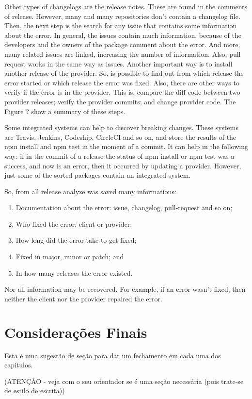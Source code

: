 Other types of changelogs are the release notes. These are found in the comments of release. However, many and many repositories don’t contain a changelog file. Then, the next step is the search for any issue that contains some information about the error. In general, the issues contain much information, because of the developers and the owners of the package comment about the error. And more, many related issues are linked, increasing the number of information. Also, pull request works in the same way as issues.
Another important way is to install another release of the provider. So, is possible to find out from which release the error started or which release the error was fixed. Also, there are other ways to verify if the error is in the provider. This is, compare the diff code between two provider releases; verify the provider commits; and change provider code.
The Figure ? show a summary of these steps.

Some integrated systems can help to discover breaking changes. These systems are Travis, Jenkins, Codeship, CircleCI and so on, and store the results of the npm install and npm test in the moment of a commit. It can help in the following way: if in the commit of a release the status of npm install or npm test was a success, and now is an error, then it occurred by updating a provider. However, just some of the sorted packages contain an integrated system.

So, from all release analyze was saved many informations:

\begin{enumerate}
    \item Documentation about the error: issue, changelog, pull-request and so on;
    \item Who fixed the error: client or provider;
    \item How long did the error take to get fixed;
    \item Fixed in major, minor or patch; and
    \item In how many releases the error existed.
\end{enumerate}{}

Nor all information may be recovered. For example, if an error wasn’t fixed, then neither the client nor the provider repaired the error.

\section{Considerações Finais}
\label{cap:metodologia:sec:consideracoes:finais}

Esta é uma sugestão de seção para dar um fechamento em cada uma dos capítulos.

(ATENÇÃO - veja com o seu orientador se é uma seção necessária (pois trate-se de estilo de escrita))